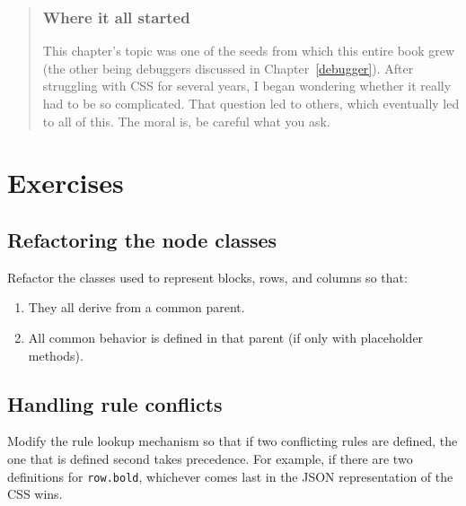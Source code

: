 \documentclass[krantzl]{krantz}
\newcommand{\chapref}[1]{Chapter~\ref{#1}}
\newenvironment{callout}{\savenotes\begin{tBox}\begin{quotation}\toggletrue{inbox}\renewcommand{\thempfootnote}{\arabic{footnote}}}{\end{quotation}\vspace{\baselineskip}\end{tBox}\togglefalse{inbox}\spewnotes}
\begin{document}
\begin{callout}


\subsubsection*{Where it all started}


This chapter’s topic was one of the seeds from which this entire book grew
(the other being debuggers discussed in \chapref{debugger}).
After struggling with CSS for several years,
I began wondering whether it really had to be so complicated.
That question led to others,
which eventually led to all of this.
The moral is,
be careful what you ask.

\end{callout}

\section{Exercises}\label{layout-engine-exercises}

\subsection*{Refactoring the node classes}


Refactor the classes used to represent blocks, rows, and columns so that:

\begin{enumerate}

\item 

They all derive from a common parent.



\item 

All common behavior is defined in that parent (if only with placeholder methods).



\end{enumerate}

\subsection*{Handling rule conflicts}


Modify the rule lookup mechanism so that if two conflicting rules are defined,
the one that is defined second takes precedence.
For example,
if there are two definitions for \texttt{row.bold},
whichever comes last in the JSON representation of the CSS wins.
\end{document}
